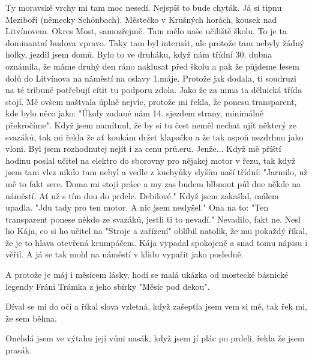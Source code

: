 

Ty moravské vrchy mi tam moc nesedí. Nejspíš to bude chyták. Já si
tipnu Meziboří (německy Schönbach). Městečko v Krušných horách, kousek
nad Litvínovem. Okres Most, samozřejmě. Tam mělo naše učiliště školu.
To je ta dominantní budova vpravo. Taky tam byl internát, ale protože
tam nebyly žádný holky, jezdil jsem domů. Bylo to ve druháku, když nám
třídní 30. dubna oznámila, že máme druhý den ráno naklusat před školu
a pak že půjdeme lesem dolů do Litvínova na náměstí na oslavy 1.máje.
Protože jak dodala, ti soudruzi na té tribuně potřebují cítit tu
podporu zdola. Jako že za nima ta dělnická třída stojí. Mě ovšem
naštvala úplně nejvíc, protože mi řekla, že ponesu transparent, kde
bylo něco jako: "Úkoly zadané nám 14. sjezdem strany, minimálně
překročíme". Když jsem namítnul, že by si tu čest neměl nechat ujít
některý ze svazáků, tak mi řekla že ať koukám držet klapačku a že tak
aspoň nezdrhnu jako vloni. Byl jsem rozhodnutej nejít i za cenu
prů.eru. Jenže... Když mě příští hodinu poslal učitel na elektro do
sborovny pro nějakej motor v řezu, tak když jsem tam vlez nikdo tam
nebyl a vedle z kuchyňky slyším naší třídní: "Jarmilo, už mě to fakt
sere. Doma mi stojí práce a my zas budem blbnout půl dne někde na
náměstí. Ať už s tím dou do prdele. Debilové." Když jsem zakašlal,
málem upadla. "Jdu tady pro ten motor. A nic jsem neslyšel." Ona na
to: "Ten transparent ponese někdo ze svazáků, jestli ti to nevadí."
Nevadilo, fakt ne. Nesl ho Kája, co si ho učitel na "Stroje a
zařízení" oblíbil natolik, že mu pokaždý říkal, že je to hlava
otevřená krumpáčem. Kája vypadal spokojeně a snad tomu nápisu i věřil.
A já se tak mohl na náměstí v klidu vypařit jako posledně.

A protože je máj i měsícem lásky, hodí se malá ukázka od mostecké
básnické legendy Fráni Trámka z jeho sbírky "Měsíc pod dekou".

Díval se mi do očí
a říkal slova vzletná,
když zašeptla jsem vem si mě,
tak řek mi, že sem běhna.

Onehdá jsem ve výtahu její vůni nasák,
když jsem jí plác po prdeli,
řekla že jsem prasák.
